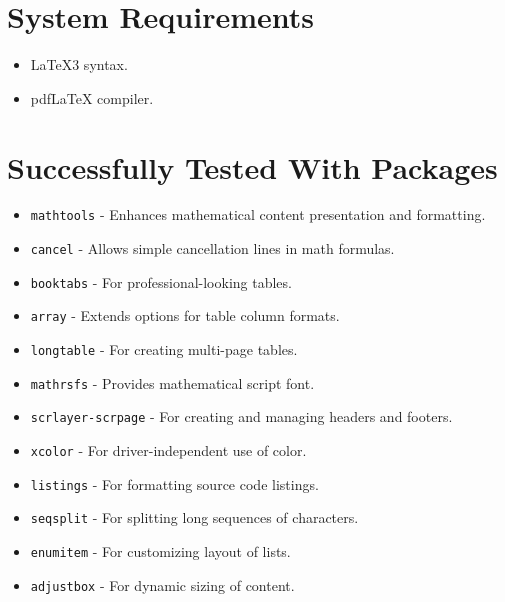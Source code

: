 \documentclass{article}
\begin{document}
\section*{System Requirements}
\begin{itemize}
    \item \LaTeX3 syntax.
    \item pdf\LaTeX{} compiler.
\end{itemize}

\section*{Successfully Tested With Packages}
\begin{itemize}
    \item \texttt{mathtools} - Enhances mathematical content presentation and formatting.
    \item \texttt{cancel} - Allows simple cancellation lines in math formulas.
    \item \texttt{booktabs} - For professional-looking tables.
    \item \texttt{array} - Extends options for table column formats.
    \item \texttt{longtable} - For creating multi-page tables.
    \item \texttt{mathrsfs} - Provides mathematical script font.
    \item \texttt{scrlayer-scrpage} - For creating and managing headers and footers.
    \item \texttt{xcolor} - For driver-independent use of color.
    \item \texttt{listings} - For formatting source code listings.
    \item \texttt{seqsplit} - For splitting long sequences of characters.
    \item \texttt{enumitem} - For customizing layout of lists.
    \item \texttt{adjustbox} - For dynamic sizing of content.
\end{itemize}
\end{document}
